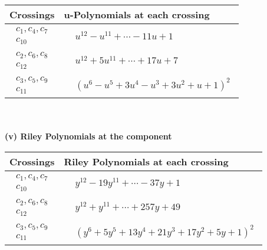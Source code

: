 \documentclass[1p]{elsarticle_modified}
\theoremstyle{definition}
\begin{document}
\begin{tabular}{m{50pt}|m{274pt}}
Crossings & \hspace{64pt}u-Polynomials at each crossing \\
\hline $$\begin{aligned}c_{1},c_{4},c_{7}\\c_{10}\end{aligned}$$&$\begin{aligned}
&u^{12}- u^{11}+\cdots-11 u+1
\end{aligned}$\\
\hline $$\begin{aligned}c_{2},c_{6},c_{8}\\c_{12}\end{aligned}$$&$\begin{aligned}
&u^{12}+5 u^{11}+\cdots+17 u+7
\end{aligned}$\\
\hline $$\begin{aligned}c_{3},c_{5},c_{9}\\c_{11}\end{aligned}$$&$\begin{aligned}
&(u^6- u^5+3 u^4- u^3+3 u^2+u+1)^2
\end{aligned}$\\
\hline
\end{tabular}\\~\\
\newpage\renewcommand{\arraystretch}{1}
\flushleft \textbf{(v) Riley Polynomials at the component}\newline \\
\begin{tabular}{m{50pt}|m{274pt}}
Crossings & \hspace{64pt}Riley Polynomials at each crossing \\
\hline $$\begin{aligned}c_{1},c_{4},c_{7}\\c_{10}\end{aligned}$$&$\begin{aligned}
&y^{12}-19 y^{11}+\cdots-37 y+1
\end{aligned}$\\
\hline $$\begin{aligned}c_{2},c_{6},c_{8}\\c_{12}\end{aligned}$$&$\begin{aligned}
&y^{12}+y^{11}+\cdots+257 y+49
\end{aligned}$\\
\hline $$\begin{aligned}c_{3},c_{5},c_{9}\\c_{11}\end{aligned}$$&$\begin{aligned}
&(y^6+5 y^5+13 y^4+21 y^3+17 y^2+5 y+1)^2
\end{aligned}$\\
\hline
\end{tabular}\\~\\
\end{document}
